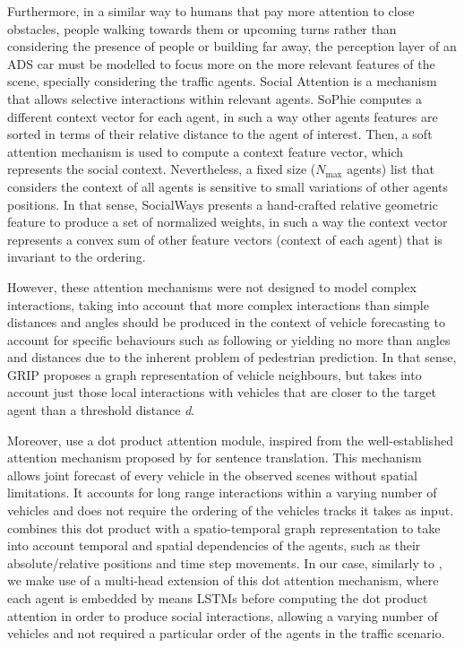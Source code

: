 Furthermore, in a similar way to humans that pay more attention to close obstacles, people walking towards them or upcoming turns rather than considering the presence of people or building far away, the perception layer of an \ac{ADS} car must be modelled to focus more on the more relevant features of the scene, specially considering the traffic agents. Social Attention is a mechanism that allows selective interactions within relevant agents. SoPhie \cite{sadeghian2019sophie} computes a different context vector for each agent, in such a way other agents features are sorted in terms of their relative distance to the agent of interest. Then, a soft attention mechanism is used to compute a context feature vector, which represents the social context. Nevertheless, a fixed size ($N_{\text{max}}$ agents) list that considers the context of all agents is sensitive to small variations \cite{mercat2020multi} of other agents positions. In that sense, SocialWays \cite{amirian2019social} presents a hand-crafted relative geometric feature to produce a set of normalized weights, in such a way the context vector represents a convex sum of other feature vectors (context of each agent) that is invariant to the ordering. 

However, these attention mechanisms were not designed to model complex interactions, taking into account that more complex interactions than simple distances and angles should be produced in the context of vehicle forecasting to account for specific behaviours such as following or yielding no more than angles and distances due to the inherent problem of pedestrian prediction. In that sense, GRIP \cite{li2019grip} proposes a graph representation of vehicle neighbours, but takes into account just those local interactions with vehicles that are closer to the target agent than a threshold distance \textit{d}. 

Moreover, \cite{vemula2018social} use a dot product attention module, inspired from the well-established attention mechanism proposed by \cite{vaswani2017attention} for sentence translation. This mechanism allows joint forecast of every vehicle in the observed scenes without spatial limitations. It accounts for long range interactions within a varying number of vehicles and does not require the ordering of the vehicles tracks it takes as input. \cite{vemula2018social} combines this dot product with a spatio-temporal graph representation to take into account temporal and spatial dependencies of the agents, such as their absolute/relative positions and time step movements. In our case, similarly to \cite{mercat2020multi}, we make use of a multi-head extension of this dot attention mechanism, where each agent is embedded by means \acp{LSTM} before computing the dot product attention in order to produce social interactions, allowing a varying number of vehicles and not required a particular order of the agents in the traffic scenario.

